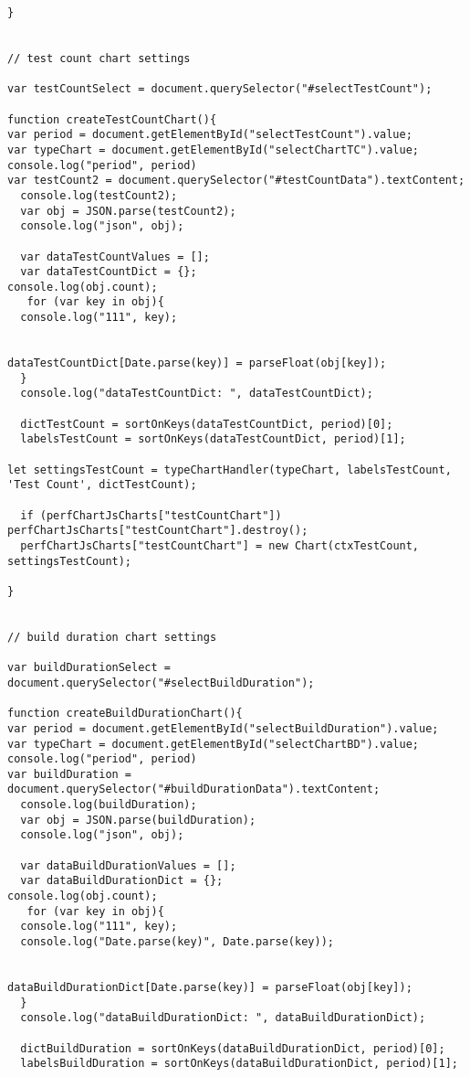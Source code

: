 \begin{lstlisting}
}


// test count chart settings

var testCountSelect = document.querySelector("#selectTestCount");

function createTestCountChart(){
var period = document.getElementById("selectTestCount").value;
var typeChart = document.getElementById("selectChartTC").value;
console.log("period", period)
var testCount2 = document.querySelector("#testCountData").textContent;
  console.log(testCount2);
  var obj = JSON.parse(testCount2);
  console.log("json", obj);

  var dataTestCountValues = [];
  var dataTestCountDict = {};
console.log(obj.count);
   for (var key in obj){
  console.log("111", key);


dataTestCountDict[Date.parse(key)] = parseFloat(obj[key]);
  }
  console.log("dataTestCountDict: ", dataTestCountDict);

  dictTestCount = sortOnKeys(dataTestCountDict, period)[0];
  labelsTestCount = sortOnKeys(dataTestCountDict, period)[1];

let settingsTestCount = typeChartHandler(typeChart, labelsTestCount, 'Test Count', dictTestCount);

  if (perfChartJsCharts["testCountChart"]) perfChartJsCharts["testCountChart"].destroy();
  perfChartJsCharts["testCountChart"] = new Chart(ctxTestCount, settingsTestCount);

}


// build duration chart settings

var buildDurationSelect = document.querySelector("#selectBuildDuration");

function createBuildDurationChart(){
var period = document.getElementById("selectBuildDuration").value;
var typeChart = document.getElementById("selectChartBD").value;
console.log("period", period)
var buildDuration = document.querySelector("#buildDurationData").textContent;
  console.log(buildDuration);
  var obj = JSON.parse(buildDuration);
  console.log("json", obj);

  var dataBuildDurationValues = [];
  var dataBuildDurationDict = {};
console.log(obj.count);
   for (var key in obj){
  console.log("111", key);
  console.log("Date.parse(key)", Date.parse(key));


dataBuildDurationDict[Date.parse(key)] = parseFloat(obj[key]);
  }
  console.log("dataBuildDurationDict: ", dataBuildDurationDict);

  dictBuildDuration = sortOnKeys(dataBuildDurationDict, period)[0];
  labelsBuildDuration = sortOnKeys(dataBuildDurationDict, period)[1];



\end{lstlisting}
